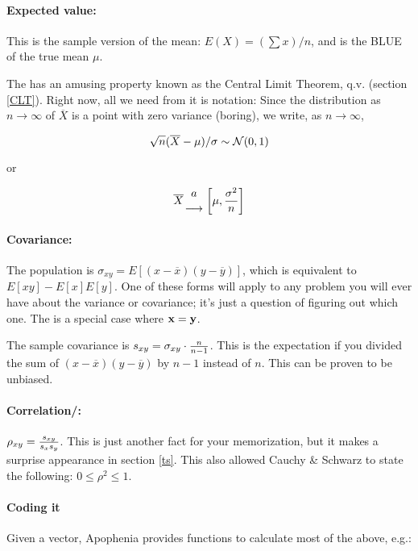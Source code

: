 \paragraph{Expected value:} This is the sample version of the mean:
$E(X)=(\sum x)/n$, and is the BLUE of the true mean
$\mu$.

The  has an amusing property known as the Central Limit
Theorem, q.v. (section \ref{CLT}). Right now, all we need from it is
notation: Since the distribution as $n\to\infty$ of $\overline X$ is a
point with zero variance (boring), we write, as $n\to\infty$,

$$\sqrt{n} (\overline X - \mu)/\sigma \sim {\cal N}(0,1)$$

or

$$\overline X {a \atop \longrightarrow} \left[\mu,{\sigma^2\over n}\right]$$

\paragraph{Covariance:} The population  is $\sigma_{xy} =
E[(x-\overline x)(y-\overline y)]$, which is equivalent to
$E[xy]-E[x]E[y]$. One of these forms will apply to any problem you will
ever have about the variance or covariance; it's just a question of
figuring out which one. The  is a special case where ${\bf x}={\bf y}$.

The sample covariance is $s_{xy}=\sigma_{xy}\cdot {n\over n-1}$. This
is
the expectation if you  divided the sum of $(x-\overline
x)(y-\overline y)$ by $n-1$ instead of $n$. This
can be proven to be unbiased.

\paragraph{Correlation/:} $\rho_{xy}={s_{xy}\over s_x
s_y}$. This is just another fact for your memorization, but it makes a
surprise appearance in section \ref{ts}. This also allowed Cauchy \&
Schwarz to state the following: $0\leq \rho^2 \leq 1$.
\label{correlation}

\paragraph{Coding it} Given a vector, Apophenia provides functions to
calculate most of the above, e.g.:

